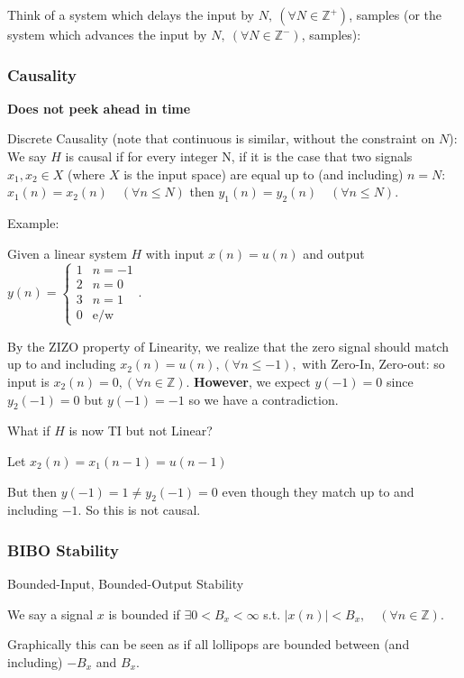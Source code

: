 Think of a system which delays the input by $N,\  (\forall N\in\mathbb Z^+)$, samples (or the system which advances the input by $N,\  (\forall N\in\mathbb Z^-)$, samples):

\newpage
\subsubsection{Causality}
\textbf{Does not peek ahead in time}

Discrete Causality (note that continuous is similar, without the constraint on $N$):\\
We say $H$ is causal if for every integer N,
if it is the case that two signals $x_1, x_2\in X$ (where $X$ is the input space) are equal up to (and including) $n=N:$ 
\\
$x_1(n)=x_2(n)\quad(\forall n\le N)$ then $y_1(n)= y_2(n) \quad(\forall n\le N)$.

Example:
\begin{shaded}
Given a linear system $H$ with input $x(n)=u(n)$ and output $y(n)=\begin{cases} 
1 & n = -1\\
2 & n = 0\\
3 & n = 1\\
0 & \text{e/w}\end{cases}$.
\end{shaded}
By the ZIZO property of Linearity, we realize that the zero signal should match up to and including $x_2(n)=u(n), (\forall n\le-1),$ with Zero-In, Zero-out: so input is $x_2(n)=0, (\forall n\in\mathbb Z)$. \textbf{However}, we expect $y(-1)=0$ since $y_2(-1)=0$ but $y(-1)=-1$ so we have a contradiction.

\begin{shaded}
What if $H$ is now TI but not Linear?
\end{shaded}
Let $x_2(n)=x_1(n-1)=u(n-1)$

But then $y(-1)=1\ne y_2(-1)=0$ even though they match up to and including $-1$. So this is not causal.

\subsubsection{BIBO Stability}
Bounded-Input, Bounded-Output Stability

We say a signal $x$ is bounded if $\exists 0 < B_x < \infty$ s.t. $|x(n)|<B_x, \quad(\forall n\in\mathbb Z)$.

Graphically this can be seen as if all lollipops are bounded between (and including) $-B_x$ and $B_x$.



